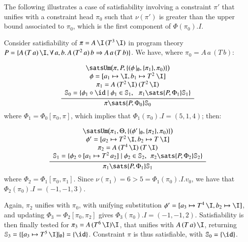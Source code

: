 \documentclass[review]{elsarticle}
\begin{document}
The following illustrates a case of satisfiability involving a
constraint $\pi'$ that unifies with a constraint head $\pi_0$ such
that $\nu(\pi')$ is greater than the upper bound associated to
$\pi_0$, which is the first component of $\Phi(\pi_0).I$.

\begin{Example}
\label{sat-eta-greater} {\rm

Consider satisfiability of $\pi=A\,\I\,(T^3\,\I)$ in program theory $P
= \{ A\,(T\,a)\,\I, \forall\, a,b.\,A\,(T^2\, a)\,b \Rightarrow
A\,a\,(T\,b)\}$. We have, where $\pi_0 = A\,a\,(T\,b)$:

\[
	\displaystyle\frac
		{\begin{array}{c}
            \satsUm\bigl(\pi,P,\{ ( \phi\,|_\emptyset, \{ \pi_1 \}, \pi_0 ) \}\bigr) \\
            \phi = [a_1\mapsto \I, b_1\mapsto T^2\:\I] \\
            \pi_1 = A\:(T^2\,\I)\:(T^2\,\I)\\
            \mathbb{S}_0 = \{ \phi_1\circ \id \mid \phi_1 \in \mathbb{S}_1,\:\:\:
            \pi_1 \sats {P,\Phi_1} \mathbb{S}_1\}
         \end{array}}
		{\pi \sats {P,\Phi_0} \mathbb{S}_0}
\]
where $\Phi_1 = \Phi_0 [\pi_0, \pi]$, which implies that $\Phi_1(\pi_0).I = (5,1,4)$; then:

\[
	\displaystyle\frac
		{\begin{array}{c}
            \satsUm\bigl(\pi_1,\Theta, \{ ( \phi'\,|_\emptyset, \{\pi_2\}, \pi_0 ) \}\bigr)\\
            \phi' = [a_2\mapsto T^2\,\I, b_2\mapsto T\,\I] \\
	    \pi_2 = A\:(T^4\,\I)\:(T\,\I)\\
            \mathbb{S}_1 = \{ \phi_2\circ [a_1\mapsto T^2\,a_2] \mid \phi_2 \in \mathbb{S}_2,\:\:
            \pi_2 \sats {P,\Phi_2} \mathbb{S}_2\}
         \end{array}}
		{\pi_1 \sats {P,\Phi_1} \mathbb{S}_1}
\]
where  $\Phi_2 = \Phi_1 [\pi_0, \pi_1]$.
Since $\nu(\pi_1) = 6 > 5 = \Phi_1(\pi_0).I.v_0$,
we have that $\Phi_2(\pi_0).I = (-1,-1,3)$.

Again, $\pi_2$ unifies with $\pi_0$, with unifying substitution
$\phi' =  [a_3\mapsto T^4\,\I, b_2\mapsto \I] $, and
updating $\Phi_3 = \Phi_2[\pi_0,\pi_2]$ gives $\Phi_3(\pi_0).I = (-1,-1,2)$.
Satisfiability is then finally tested for $\pi_3 = A\,(T^6\,\I) \I$, that unifies with
$A\,(T\,a)\,\I$, returning $\mathbb{S}_3 = \{ [a_3\mapsto
  T^5\,\I]|_\emptyset\} = \{ \id\}$.  Constraint $\pi$ is thus
satisfiable, with $\mathbb{S}_0 = \{\id\}$.}
\end{Example}
\end{document}
